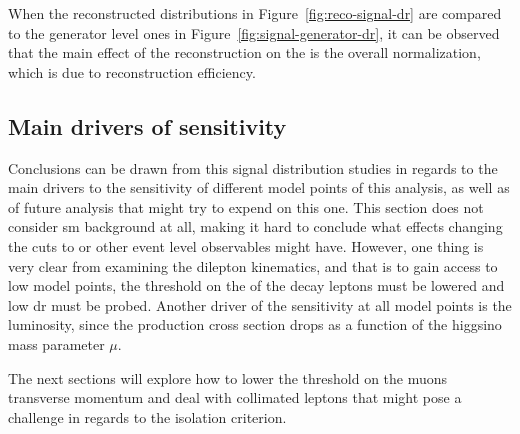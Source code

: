 When the reconstructed \drmm distributions in Figure~\ref{fig:reco-signal-dr} are compared to the generator level ones in Figure~\ref{fig:signal-generator-dr}, it can be observed that the main effect of the reconstruction on the \drmm is the overall normalization, which is due to reconstruction efficiency.

\clearpage 
\subsection{Main drivers of sensitivity}

Conclusions can be drawn from this signal distribution studies in regards to the main drivers to the sensitivity of different model points of this analysis, as well as of future analysis that might try to expend on this one. This section does not consider \gls{sm} background at all, making it hard to conclude what effects changing the cuts to \MET or other event level observables might have. However, one thing is very clear from examining the dilepton kinematics, and that is to gain access to low \dm model points, the threshold on the \pt of the decay leptons must be lowered and low \gls{dr} must be probed. Another driver of the sensitivity at all \dm model points is the luminosity, since the production cross section drops as a function of the higgsino mass parameter $\mu$.

The next sections will explore how to lower the threshold on the muons transverse momentum and deal with collimated leptons that might pose a challenge in regards to the isolation criterion.
